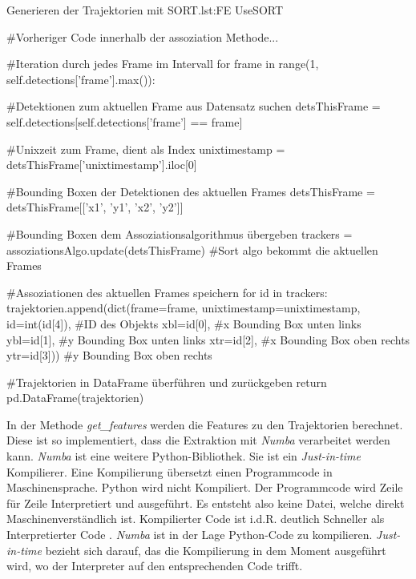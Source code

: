 \begin{pythoncode}{Generieren der Trajektorien mit SORT.}{lst:FE UseSORT}

#Vorheriger Code innerhalb der assoziation Methode...

#Iteration durch jedes Frame im Intervall
for frame in range(1, self.detections['frame'].max()):
    
    #Detektionen zum aktuellen Frame aus Datensatz suchen
    detsThisFrame = self.detections[self.detections['frame'] == frame]

    #Unixzeit zum Frame, dient als Index
    unixtimestamp = detsThisFrame['unixtimestamp'].iloc[0]

    #Bounding Boxen der Detektionen des aktuellen Frames
    detsThisFrame = detsThisFrame[['x1', 'y1', 'x2', 'y2']] 

    #Bounding Boxen dem Assoziationsalgorithmus übergeben
    trackers = assoziationsAlgo.update(detsThisFrame) #Sort algo bekommt die aktuellen Frames

    #Assoziationen des aktuellen Frames speichern 
    for id in trackers:
        trajektorien.append(dict(frame=frame,
                          unixtimestamp=unixtimestamp, 
                          id=int(id[4]),    #ID des Objekts
                          xbl=id[0],        #x Bounding Box unten links
                          ybl=id[1],        #y Bounding Box unten links
                          xtr=id[2],        #x Bounding Box oben rechts
                          ytr=id[3]))       #y Bounding Box oben rechts

    #Trajektorien in DataFrame überführen und zurückgeben
    return pd.DataFrame(trajektorien)
\end{pythoncode}

In der Methode \textit{get\_features} werden die Features zu den Trajektorien berechnet. Diese ist so implementiert, dass die Extraktion mit \textit{Numba} verarbeitet werden kann. \textit{Numba} ist eine weitere Python-Bibliothek. Sie ist ein \textit{\gls{Just-in-time}} Kompilierer. Eine Kompilierung übersetzt einen Programmcode in Maschinensprache. Python wird nicht Kompiliert. Der Programmcode wird Zeile für Zeile Interpretiert und ausgeführt. Es entsteht also keine Datei, welche direkt Maschinenverständlich ist. Kompilierter Code ist i.d.R. deutlich Schneller als Interpretierter Code . \textit{Numba} ist in der Lage Python-Code zu kompilieren. \textit{Just-in-time} bezieht sich darauf, das die Kompilierung in dem Moment ausgeführt wird, wo der Interpreter auf den entsprechenden Code trifft. \par

